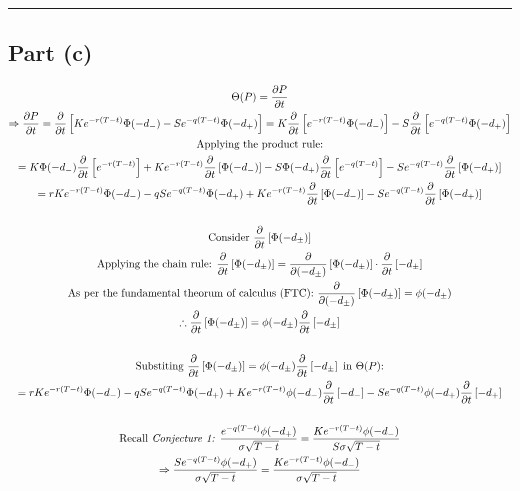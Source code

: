 \documentclass[letterpaper,10pt]{article}
\newcommand{\partiald}[2]{\frac{\partial #1}{\partial #2}}
\begin{document}
		\hrule

		\subsection{Part (c)}
			\begin{gather*}
				\Theta(P) = \partiald{P}{t} \\
				\Rightarrow \partiald{P}{t} = \partiald{}{t}\left[ Ke^{-r(T-t)}\Phi(-d_{-}) - Se^{-q(T-t)}\Phi(-d_{+}) \right] = K \partiald{}{t} \left[ e^{-r(T-t)} \Phi(-d_-) \right] - S \partiald{}{t}\left[e^{-q(T-t)} \Phi(-d_+) \right] \\
				\text{Applying the product rule:} \\
				= K\Phi(-d_-) \partiald{}{t}\left[ e^{-r(T-t)} \right] + K e^{-r(T-t)} \partiald{}{t} \left[ \Phi(-d_-) \right] - S \Phi(-d_+)\partiald{}{t}\left[ e^{-q(T-t)} \right] - Se^{-q(T-t)} \partiald{}{t} \left[ \Phi(-d_+) \right] \\
				= rKe^{-r(T-t)} \Phi(-d_-) - qSe^{-q(T-t)}\Phi(-d_+) + Ke^{-r(T-t)}\partiald{}{t}\left[\Phi(-d_-)\right] - Se^{-q(T-t)}\partiald{}{t}\left[ \Phi(-d_+) \right] \\
				\\
				\text{Consider } \partiald{}{t}\left[ \Phi(-d_\pm) \right] \\
				\text{Applying the chain rule: } \partiald{}{t}\left[ \Phi(-d_\pm) \right] = \partiald{}{(-d_\pm)}\left[ \Phi(-d_\pm) \right] \cdot \partiald{}{t}\left[ -d_\pm \right] \\
				\text{As per the fundamental theorum of calculus (FTC): } \partiald{}{(-d_{\pm})} \left[\Phi(-d_{\pm}) \right] = \phi(-d_{\pm}) \\
				\therefore \partiald{}{t}\left[ \Phi(-d_\pm) \right] = \phi(-d_\pm) \partiald{}{t} \left[ -d_\pm \right] \\
				\\
				\text{Substiting } \partiald{}{t}\left[ \Phi(-d_\pm) \right] = \phi(-d_\pm) \partiald{}{t} \left[ -d_\pm \right] \text{ in } \Theta(P) \text{:} \\
				= rKe^{-r(T-t)} \Phi(-d_-) - qSe^{-q(T-t)}\Phi(-d_+) + Ke^{-r(T-t)}\phi(-d_-)\partiald{}{t}\left[-d_-\right] - Se^{-q(T-t)}\phi(-d_+)\partiald{}{t}\left[ -d_+ \right] \\
				\\
				\text{Recall \textit{Conjecture 1:} } \frac{e^{-q(T-t)} \phi(-d_{+})}{\sigma \sqrt{T-t}} = \frac{Ke^{-r(T-t)}\phi(-d_{-})}{S \sigma \sqrt{T-t}} \\
				\Rightarrow \frac{Se^{-q(T-t)} \phi(-d_{+})}{\sigma \sqrt{T-t}}=\frac{Ke^{-r(T-t)}\phi(-d_{-})}{\sigma\sqrt{T-t}} \\

\end{gather*}
\end{document}
